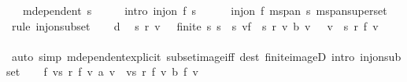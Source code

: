 \begin{isabellebody}
\ \ \ {\isachardoublequoteopen}m{}{\isachardot}{\kern0pt}dependent\ s{\isachardoublequoteclose}\isanewline
%
\isadelimproof
%
\endisadelimproof
%
\isatagproof
{}\isamarkupfalse%
\ {\isacharminus}{\kern0pt}\isanewline
\ \ \isamarkupfalse%
\ {\isacharbrackleft}{\kern0pt}intro{\isacharbrackright}{\kern0pt}{\isacharcolon}{\kern0pt}\ {\isachardoublequoteopen}inj{\isacharunderscore}{\kern0pt}on\ f\ s{\isachardoublequoteclose}\isanewline
\ \ \ \ \isamarkupfalse%
\ {\isacartoucheopen}inj{\isacharunderscore}{\kern0pt}on\ f\ {\isacharparenleft}{\kern0pt}m{}{\isachardot}{\kern0pt}span\ s{\isacharparenright}{\kern0pt}{\isacartoucheclose}\ m{}{\isachardot}{\kern0pt}span{\isacharunderscore}{\kern0pt}superset\ \isamarkupfalse%
\ {\isacharparenleft}{\kern0pt}rule\ inj{\isacharunderscore}{\kern0pt}on{\isacharunderscore}{\kern0pt}subset{\isacharparenright}{\kern0pt}\isanewline
\ \ \isamarkupfalse%
\ d\ \isamarkupfalse%
\ s{\isacharprime}{\kern0pt}\ r\ v\ \ {\isacharasterisk}{\kern0pt}{\isacharcolon}{\kern0pt}\ {\isachardoublequoteopen}finite\ s{\isacharprime}{\kern0pt}{\isachardoublequoteclose}\ {\isachardoublequoteopen}s{\isacharprime}{\kern0pt}\ {\isasymsubseteq}\ s{\isachardoublequoteclose}\ {\isachardoublequoteopen}{\isacharparenleft}{\kern0pt}{\isasymSum}v{\isasymin}f\ {\isacharbackquote}{\kern0pt}\ s{\isacharprime}{\kern0pt}{\isachardot}{\kern0pt}\ r\ v\ {\isacharasterisk}{\kern0pt}b\ v{\isacharparenright}{\kern0pt}\ {\isacharequal}{\kern0pt}\ {}{\isachardoublequoteclose}\ {\isachardoublequoteopen}v\ {\isasymin}\ s{\isacharprime}{\kern0pt}{\isachardoublequoteclose}\ {\isachardoublequoteopen}r\ {\isacharparenleft}{\kern0pt}f\ v{\isacharparenright}{\kern0pt}\ {\isasymnoteq}\ {}{\isachardoublequoteclose}\isanewline
\ \ \ \ \isamarkupfalse%
\ {\isacharparenleft}{\kern0pt}auto\ simp{\isacharcolon}{\kern0pt}\ m{}{\isachardot}{\kern0pt}dependent{\isacharunderscore}{\kern0pt}explicit\ subset{\isacharunderscore}{\kern0pt}image{\isacharunderscore}{\kern0pt}iff\ dest{\isacharbang}{\kern0pt}{\isacharcolon}{\kern0pt}\ finite{\isacharunderscore}{\kern0pt}imageD\ intro{\isacharcolon}{\kern0pt}\ inj{\isacharunderscore}{\kern0pt}on{\isacharunderscore}{\kern0pt}subset{\isacharparenright}{\kern0pt}\isanewline
\ \ \isamarkupfalse%
\ {\isachardoublequoteopen}f\ {\isacharparenleft}{\kern0pt}{\isasymSum}v{\isasymin}s{\isacharprime}{\kern0pt}{\isachardot}{\kern0pt}\ r\ {\isacharparenleft}{\kern0pt}f\ v{\isacharparenright}{\kern0pt}\ {\isacharasterisk}{\kern0pt}a\ v{\isacharparenright}{\kern0pt}\ {\isacharequal}{\kern0pt}\ {\isacharparenleft}{\kern0pt}{\isasymSum}v{\isasymin}s{\isacharprime}{\kern0pt}{\isachardot}{\kern0pt}\ r\ {\isacharparenleft}{\kern0pt}f\ v{\isacharparenright}{\kern0pt}\ {\isacharasterisk}{\kern0pt}b\ f\ v{\isacharparenright}{\kern0pt}{\isachardoublequoteclose}\isanewline

\end{isabellebody}
